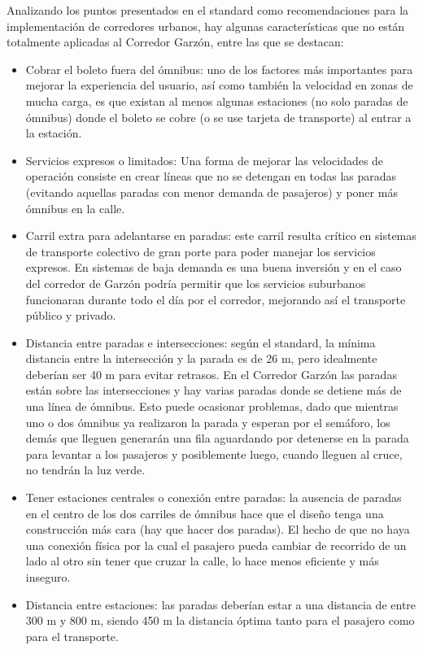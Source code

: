 Analizando los puntos presentados en el standard como recomendaciones para la implementación de corredores urbanos, hay algunas características que no están totalmente aplicadas al Corredor Garzón, entre las que se destacan:

\begin{itemize}
	\item Cobrar el boleto fuera del ómnibus: uno de los factores más importantes para mejorar la experiencia del usuario, así como también la velocidad en zonas de mucha carga, es que existan al menos algunas estaciones (no solo paradas de ómnibus) donde el boleto se cobre (o se use tarjeta de transporte) al entrar a la estación.
	\item Servicios expresos o limitados: Una forma de mejorar las velocidades de operación consiste en crear líneas que no se detengan en todas las paradas (evitando aquellas paradas con menor demanda de pasajeros) y poner más ómnibus en la calle.
	\item Carril extra para adelantarse en paradas: este carril resulta crítico en sistemas de transporte colectivo de gran porte para poder manejar los servicios expresos. En sistemas de baja demanda es una buena inversión y en el caso del corredor de Garzón podría permitir que los servicios suburbanos funcionaran durante todo el día por el corredor, mejorando así el transporte público y privado.
	\item Distancia entre paradas e intersecciones: según el standard, la mínima distancia entre la intersección y la parada es de 26 m, pero idealmente deberían ser 40 m para evitar retrasos. En el Corredor Garzón las paradas están sobre las intersecciones y hay varias paradas donde se detiene más de una línea de ómnibus. Esto puede ocasionar problemas, dado que mientras uno o dos ómnibus ya realizaron la parada y esperan por el semáforo, los demás que lleguen generarán una fila aguardando por detenerse en la parada para levantar a los pasajeros y posiblemente luego, cuando lleguen al cruce, no tendrán la luz verde.
	\item Tener estaciones centrales o conexión entre paradas: la ausencia de paradas en el centro de los dos carriles de ómnibus hace que el diseño tenga una construcción más cara (hay que hacer dos paradas). El hecho de que no haya una conexión física por la cual el pasajero pueda cambiar de recorrido de un lado al otro sin tener que cruzar la calle, lo hace menos eficiente y más inseguro.
	\item Distancia entre estaciones:  las paradas deberían estar a una distancia de entre 300 m y 800 m, siendo 450 m la distancia óptima tanto para el pasajero como para el transporte.

\end{itemize}
